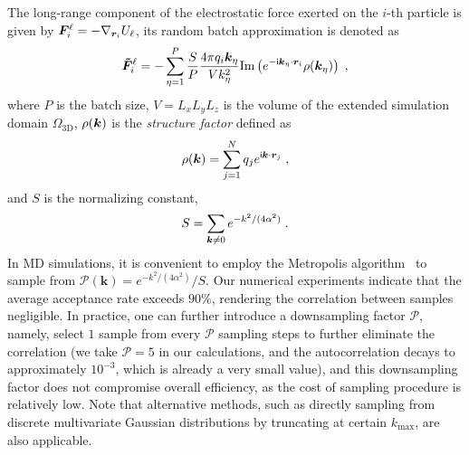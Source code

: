 The long-range component of the electrostatic force exerted on the $i$-th particle is given by $\boldsymbol{F}_i^{\ell}=-\nabla_{\bm{r}_i}U_{\ell}$, its random batch approximation is denoted as
\begin{equation}\label{eq:forceRBE}
\begin{aligned}
    \boldsymbol{\tilde{F}}_i^{\ell}=-\sum_{\eta=1}^P \frac{S}{P}\frac{4\pi q_i\boldsymbol{k}_\eta}{Vk_{\eta}^2} \text{Im}\left(e^{-\mathsf i \boldsymbol{k}_\eta\cdot \boldsymbol{r}_i}\rho(\boldsymbol{k}_\eta)\right)\;,
\end{aligned}
\end{equation}
where $P$ is the batch size, $V=L_xL_yL_z$ is the volume of the extended simulation domain $\Omega_{\text{3D}}$, 
 {
$\rho(\boldsymbol{k})$ is the \textit{structure factor} defined as
\begin{equation}
    \rho(\boldsymbol{k})=\sum_{j=1}^N q_j e^{\mathsf i \boldsymbol{k}\cdot \boldsymbol{r}_j}\;,
\end{equation}
}
and $S$ is the normalizing constant,
\begin{equation}\label{eq:normalizingS}
\begin{aligned}
S=\sum_{\boldsymbol{k} \neq 0} e^{-k^2/(4\alpha^2)}\;.
\end{aligned}
\end{equation}
In MD simulations, it is convenient to employ the Metropolis algorithm~\cite{metropolis1953equation} to sample from $\mathscr{P}(\bm{k})=e^{-k^2/(4\alpha^2)}/S$. 
 {Our numerical experiments indicate that the average acceptance rate exceeds $90\%$, rendering the correlation between samples negligible. In practice, one can further introduce a downsampling factor $\mathcal{P}$, namely, select $1$ sample from every $\mathcal{P}$ sampling steps to further eliminate the correlation (we take $\mathcal{P}=5$ in our calculations, and the autocorrelation decays to approximately $10^{-3}$, which is already a very small value), and this downsampling factor does not compromise overall efficiency, as the cost of sampling procedure is relatively low. Note that alternative methods, such as directly sampling from discrete multivariate Gaussian distributions by truncating at certain $k_{\mathrm{max}}$, are also applicable.}


